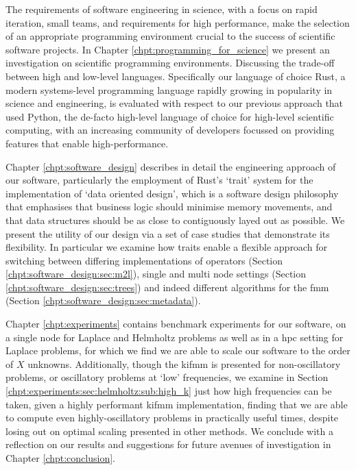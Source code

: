 The requirements of software engineering in science, with a focus on rapid iteration, small teams, and requirements for high performance, make the selection of an appropriate programming environment crucial to the success of scientific software projects. In Chapter \ref{chpt:programming_for_science} we present an investigation on scientific programming environments. Discussing the trade-off between high and low-level languages. Specifically our language of choice Rust, a modern systems-level programming language rapidly growing in popularity in science and engineering, is evaluated with respect to our previous approach that used Python, the de-facto high-level language of choice for high-level scientific computing, with an increasing community of developers focussed on providing features that enable high-performance.

Chapter \ref{chpt:software_design} describes in detail the engineering approach of our software, particularly the employment of Rust's `trait' system for the implementation of `data oriented design', which is a software design philosophy that emphasises that business logic should minimise memory movements, and that data structures should be as close to contiguously layed out as possible. We present the utility of our design via a set of case studies that demonstrate its flexibility. In particular we examine how traits enable a flexible approach for switching between differing implementations of operators (Section \ref{chpt:software_design:sec:m2l}), single and multi node settings (Section \ref{chpt:software_design:sec:trees}) and indeed different algorithms for the \acrshort{fmm} (Section \ref{chpt:software_design:sec:metadata}).

Chapter \ref{chpt:experiments} contains benchmark experiments for our software, on a single node for Laplace and Helmholtz problems as well as in a \acrshort{hpc} setting for Laplace problems, for which we find we are able to scale our software to the order of $X$ unknowns. Additionally, though the \acrshort{kifmm} is presented for non-oscillatory problems, or oscillatory problems at `low' frequencies, we examine in Section \ref{chpt:experiments:sec:helmholtz:sub:high_k} just how high frequencies can be taken, given a highly performant \acrshort{kifmm} implementation, finding that we are able to compute even highly-oscillatory problems in practically useful times, despite losing out on optimal scaling presented in other methods. We conclude with a reflection on our results and suggestions for future avenues of investigation in Chapter \ref{chpt:conclusion}.


